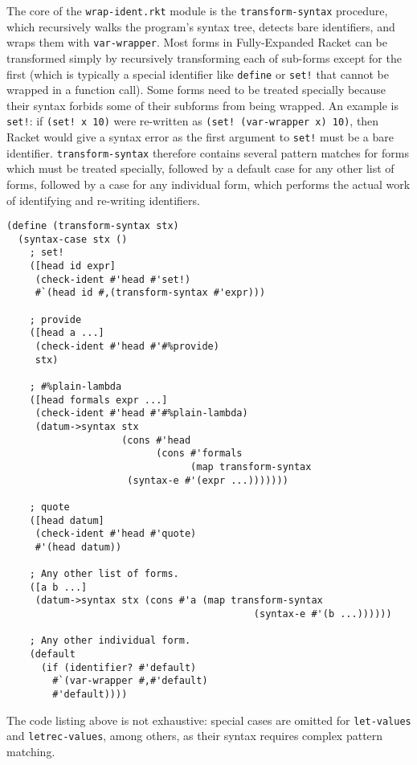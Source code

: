 \documentclass{article}
\begin{document}
The core of the \texttt{wrap-ident.rkt} module is the \texttt{transform-syntax} procedure, which recursively walks the program's syntax tree, detects bare identifiers, and wraps them with \texttt{var-wrapper}. Most forms in Fully-Expanded Racket can be transformed simply by recursively transforming each of sub-forms except for the first (which is typically a special identifier like \texttt{define} or \texttt{set!} that cannot be wrapped in a function call). Some forms need to be treated specially because their syntax forbids some of their subforms from being wrapped. An example is \texttt{set!}: if \texttt{(set! x 10)} were re-written as \texttt{(set! (var-wrapper x) 10)}, then Racket would give a syntax error as the first argument to \texttt{set!} must be a bare identifier. \texttt{transform-syntax} therefore contains several pattern matches for forms which must be treated specially, followed by a default case for any other list of forms, followed by a case for any individual form, which performs the actual work of identifying and re-writing identifiers.

\begin{lstlisting}
(define (transform-syntax stx)
  (syntax-case stx ()
    ; set!
    ([head id expr]
     (check-ident #'head #'set!)
     #`(head id #,(transform-syntax #'expr)))

    ; provide
    ([head a ...]
     (check-ident #'head #'#%provide)
     stx)

    ; #%plain-lambda
    ([head formals expr ...]
     (check-ident #'head #'#%plain-lambda)
     (datum->syntax stx
                    (cons #'head
                          (cons #'formals
                                (map transform-syntax
				     (syntax-e #'(expr ...)))))))

    ; quote
    ([head datum]
     (check-ident #'head #'quote)
     #'(head datum))

    ; Any other list of forms.
    ([a b ...]
     (datum->syntax stx (cons #'a (map transform-syntax
                                           (syntax-e #'(b ...))))))

    ; Any other individual form.
    (default
      (if (identifier? #'default)
        #`(var-wrapper #,#'default)
        #'default))))
\end{lstlisting}

The code listing above is not exhaustive: special cases are omitted for \texttt{let-values} and \texttt{letrec-values}, among others, as their syntax requires complex pattern matching.
\end{document}
